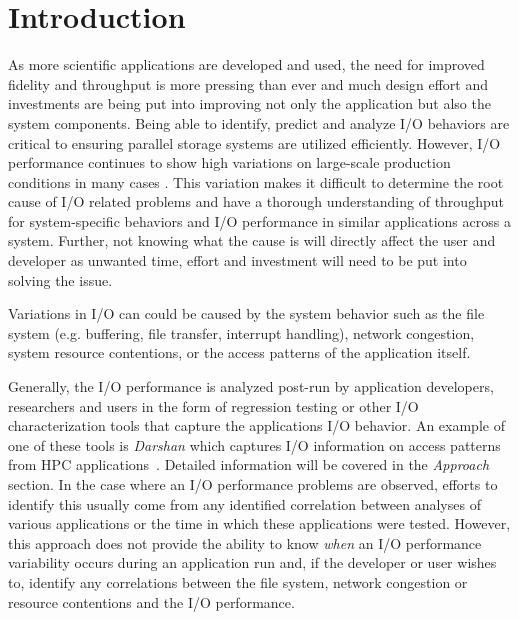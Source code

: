 \section{Introduction}
As more scientific applications are developed and used, the need for improved fidelity and throughput is more pressing than ever and much design effort and investments are being put into improving not only the application but also the system components. Being able to identify, predict and analyze I/O behaviors are critical to ensuring parallel storage systems are utilized efficiently. However, I/O performance continues to show high variations on large-scale production conditions in many cases . %
This variation makes it difficult to determine the root cause of I/O related problems and have a thorough understanding of throughput for system-specific behaviors and I/O performance in similar applications across a system. Further, not knowing what the cause is will directly affect the user and developer as unwanted time, effort and investment will need to be put into solving the issue.

Variations in I/O can could be caused by the system behavior such as the file system (e.g. buffering, file transfer, interrupt handling), network congestion, system resource contentions, or the access patterns of the application itself.

Generally, the I/O performance is analyzed post-run by application developers, researchers and users in the form of regression testing or other I/O characterization tools that capture the applications I/O behavior. An example of one of these tools is \emph{Darshan} which captures I/O information on access patterns from HPC applications~\cite{Darshan}. Detailed information will be covered in the \emph{Approach} section. In the case where an I/O performance problems are observed, efforts to identify this usually come from any identified correlation between analyses of various applications or the time in which these applications were tested. However, this approach does not provide the ability to know \emph{when} an I/O performance variability occurs during an application run and, if the developer or user wishes to, identify any correlations between the file system, network congestion or resource contentions and the I/O performance.


